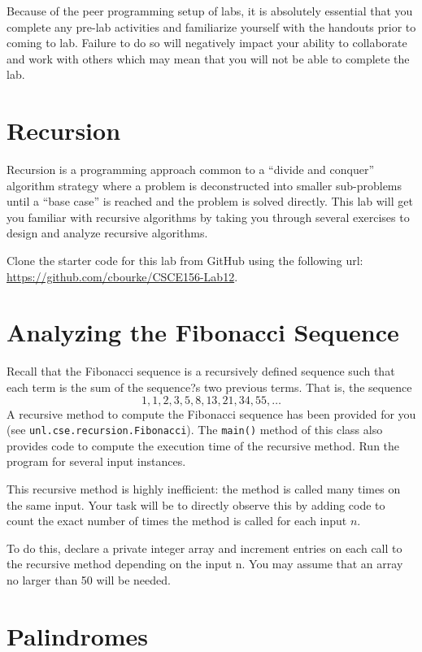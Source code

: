 \documentclass[12pt]{scrartcl}
\begin{document}
Because of the peer programming setup of labs, it is absolutely 
essential that you complete any pre-lab activities and familiarize
yourself with the handouts prior to coming to lab.  Failure to do
so will negatively impact your ability to collaborate and work with 
others which may mean that you will not be able to complete the
lab.  


\section*{Recursion}

Recursion is a programming approach common to a ``divide and conquer'' 
algorithm strategy where a problem is deconstructed into smaller 
sub-problems until a ``base case'' is reached and the problem is 
solved directly.  This lab will get you familiar with recursive 
algorithms by taking you through several exercises to design and 
analyze recursive algorithms.  

Clone the starter code for this lab from GitHub using the following
url: \url{https://github.com/cbourke/CSCE156-Lab12}.

\section*{Analyzing the Fibonacci Sequence}

Recall that the Fibonacci sequence is a recursively defined sequence 
such that each term is the sum of the sequence?s two previous terms.  
That is, the sequence
  $$1, 1, 2, 3, 5, 8, 13, 21, 34, 55, \ldots$$
A recursive method to compute the Fibonacci sequence has been provided 
for you (see \texttt{unl.cse.recursion.Fibonacci}).  The 
\texttt{main()} method of this class also provides code to 
compute the execution time of the recursive method.  Run the program 
for several input instances.  

This recursive method is highly inefficient: the method is called 
many times on the same input.  Your task will be to directly observe 
this by adding code to count the exact number of times the method is 
called for each input $n$.

To do this, declare a private integer array and increment entries on 
each call to the recursive method depending on the input n.  You may 
assume that an array no larger than 50 will be needed.

\section*{Palindromes}
\end{document}
